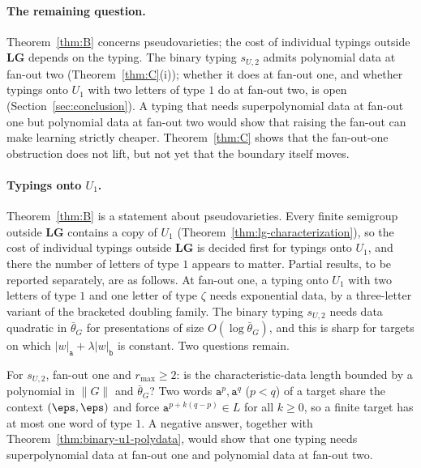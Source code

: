 \paragraph{The remaining question.}
Theorem~\ref{thm:B} concerns pseudovarieties; the cost of individual typings
outside $\mathbf{LG}$ depends on the typing.  The binary typing $s_{U,2}$ admits
polynomial data at fan-out two (Theorem~\ref{thm:C}(i)); whether it does at
fan-out one, and whether typings onto $U_1$ with two letters of type $1$ do at
fan-out two, is open (Section~\ref{sec:conclusion}).  A typing that needs
superpolynomial data at fan-out one but polynomial data at fan-out two would
show that raising the fan-out can make learning strictly cheaper.
Theorem~\ref{thm:C} shows that the fan-out-one obstruction does not lift, but
not yet that the boundary itself moves.

\paragraph{Typings onto $U_1$.}
Theorem~\ref{thm:B} is a statement about pseudovarieties.  Every finite
semigroup outside $\mathbf{LG}$ contains a copy of $U_1$
(Theorem~\ref{thm:lg-characterization}), so the cost of individual typings
outside $\mathbf{LG}$ is decided first for typings onto $U_1$, and there the
number of letters of type $1$ appears to matter.  Partial results, to be
reported separately, are as follows.  At fan-out one, a typing onto $U_1$ with
two letters of type $1$ and one letter of type $\zeta$ needs exponential data,
by a three-letter variant of the bracketed doubling family.  The binary typing
$s_{U,2}$ needs data quadratic in $\bar\theta_G$ for presentations of size
$O(\log\bar\theta_G)$, and this is sharp for targets on which
$|w|_{\mathtt a}+\lambda|w|_{\mathtt b}$ is constant.  Two questions remain.

\begin{openproblem}
\label{op:S1}
For $s_{U,2}$, fan-out one and $r_{\max}\ge2$: is the characteristic-data length
bounded by a polynomial in $\|G\|$ and $\bar\theta_G$?  Two words
$\mathtt a^p,\mathtt a^q$ ($p<q$) of a target share the context $(\eps,\eps)$ and
force $\mathtt a^{p+k(q-p)}\in L$ for all $k\ge0$, so a finite target has at most
one word of type $1$.  A negative answer, together with
Theorem~\ref{thm:binary-u1-polydata}, would show that one typing needs
superpolynomial data at fan-out one and polynomial data at fan-out two.
\end{openproblem}

